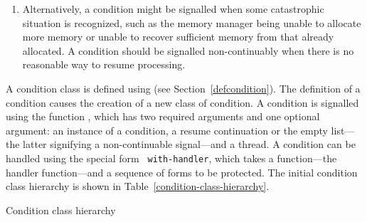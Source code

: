 \begin{optDefinition}
\begin{enumerate}
    \item {} Alternatively, a condition
    might be signalled when some catastrophic situation is recognized, such as
    the memory manager being unable to allocate more memory or unable to recover
    sufficient memory from that already allocated.  A condition should be
    signalled non-continuably when there is no reasonable way to resume
    processing.
\end{enumerate}
%
A condition class is defined using  (see
Section~\ref{defcondition}).  The definition of a condition causes the
creation of a new class of condition.  A condition is signalled using
the function , which has two required arguments and one
optional argument: an instance of a condition, a resume continuation
or the empty list---the latter signifying a non-continuable signal---and a
thread.  A condition can be handled using the special form {\tt
with-handler}, which takes a function---the handler function---and a
sequence of forms to be protected.  The initial condition class
hierarchy is shown in Table~\ref{condition-class-hierarchy}.
%
\begin{table}
\caption{Condition class hierarchy}
\label{condition-class-hierarchy}
{\tt
    \\
    \tts{}\\
    \tts\tts{}\\
    \tts\tts{}\\
    \tts\tts{}\\
    \tts{}\\
    \tts{}\\
    \tts\tts {}\\
    \tts{}\\
    \tts\tts{}\\
    \tts{}\\
    \tts\tts{}\\
    \tts{}\\
    \tts{}\\
    \tts\tts{}\\
    \tts\tts{}\\
}
\end{table}
\end{optDefinition}
